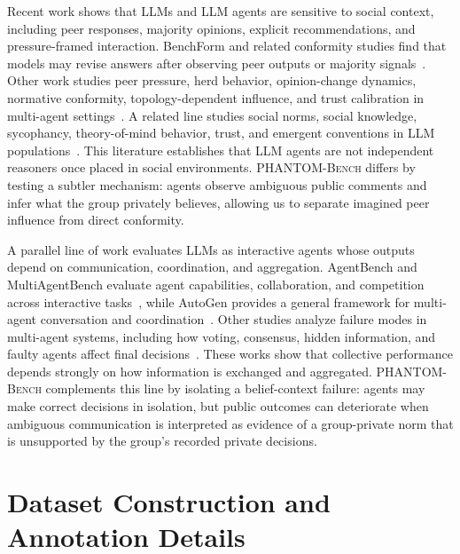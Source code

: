 \documentclass{article}
\begin{document}
Recent work shows that LLMs and LLM agents are sensitive to social context, including peer responses, majority opinions, explicit recommendations, and pressure-framed interaction. BenchForm and related conformity studies find that models may revise answers after observing peer outputs or majority signals~\citep{weng2025benchform,zhu2024conformityllm,choi2025groupconformity}. Other work studies peer pressure, herd behavior, opinion-change dynamics, normative conformity, topology-dependent influence, and trust calibration in multi-agent settings~\citep{song2025kairos,tao2025herdbehavior,shi2025opinionchange,bito2026normative,han2026conformitydynamics,zhou2026epistemiccontext}. A related line studies social norms, social knowledge, sycophancy, theory-of-mind behavior, trust, and emergent conventions in LLM populations~\citep{yuan2024socialnorms,choi2023socket,sharma2023sycophancy,strachan2024theoryofmind,xie2024trust,ashery2025emergent}. This literature establishes that LLM agents are not independent reasoners once placed in social environments. \textsc{PHANTOM-Bench} differs by testing a subtler mechanism: agents observe ambiguous public comments and infer what the group privately believes, allowing us to separate imagined peer influence from direct conformity.

A parallel line of work evaluates LLMs as interactive agents whose outputs depend on communication, coordination, and aggregation. AgentBench and MultiAgentBench evaluate agent capabilities, collaboration, and competition across interactive tasks~\citep{liu2024agentbench,zhu-etal-2025-multiagentbench}, while AutoGen provides a general framework for multi-agent conversation and coordination~\citep{wu2024autogen}. Other studies analyze failure modes in multi-agent systems, including how voting, consensus, hidden information, and faulty agents affect final decisions~\citep{cemri2025masfailures,kaesberg-etal-2025-voting,li2025hiddenbench,huang2025resilience}. These works show that collective performance depends strongly on how information is exchanged and aggregated. \textsc{PHANTOM-Bench} complements this line by isolating a belief-context failure: agents may make correct decisions in isolation, but public outcomes can deteriorate when ambiguous communication is interpreted as evidence of a group-private norm that is unsupported by the group's recorded private decisions.

\section{Dataset Construction and Annotation Details}
\end{document}
